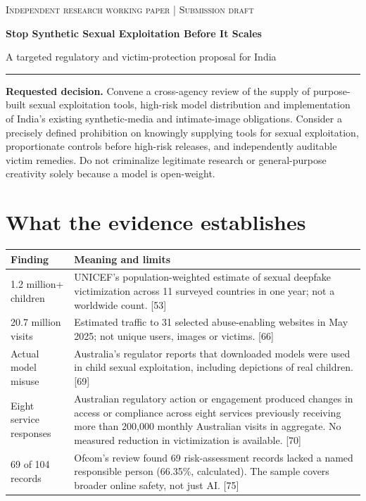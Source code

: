 \documentclass[11pt,a4paper]{article}
\begin{document}
{\small\textsc{Independent research working paper | Submission draft}}\par\vspace{3mm}
{\color{ink}\LARGE\bfseries Stop Synthetic Sexual Exploitation Before It Scales}\par
{\large A targeted regulatory and victim-protection proposal for India}\par\rule{\linewidth}{.7pt}
\textbf{Requested decision.} Convene a cross-agency review of the supply of purpose-built sexual exploitation tools, high-risk model distribution and implementation of India's existing synthetic-media and intimate-image obligations. Consider a precisely defined prohibition on knowingly supplying tools for sexual exploitation, proportionate controls before high-risk releases, and independently auditable victim remedies. Do not criminalize legitimate research or general-purpose creativity solely because a model is open-weight.

\section*{What the evidence establishes}
\begin{tabularx}{\linewidth}{@{}p{.25\linewidth}X@{}}\toprule
\textbf{Finding} & \textbf{Meaning and limits}\\\midrule
1.2 million+ children & UNICEF's population-weighted estimate of sexual deepfake victimization across 11 surveyed countries in one year; not a worldwide count. [53]\\
20.7 million visits & Estimated traffic to 31 selected abuse-enabling websites in May 2025; not unique users, images or victims. [66]\\
Actual model misuse & Australia's regulator reports that downloaded models were used in child sexual exploitation, including depictions of real children. [69]\\
Eight service responses & Australian regulatory action or engagement produced changes in access or compliance across eight services previously receiving more than 200,000 monthly Australian visits in aggregate. No measured reduction in victimization is available. [70]\\
69 of 104 records & Ofcom's review found 69 risk-assessment records lacked a named responsible person (66.35\%, calculated). The sample covers broader online safety, not just AI. [75]\\\bottomrule\end{tabularx}
\end{document}
